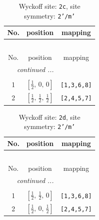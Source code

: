 \documentclass[fleqn,8pt]{jsarticle}
\begin{document}
\begin{longtable}{ccc}
\caption{Wyckoff site: {\tt 2c}, site symmetry: {\tt 2'/m'}}
 \\
 \hline \hline
No. & position & mapping \\ \hline \endfirsthead

\multicolumn{2}{l}{\tablename\ \thetable{}} \\
 \hline \hline
No. & position & mapping \\ \hline \endhead

 \hline \hline
\multicolumn{2}{r}{\footnotesize\it continued ...} \\ \endfoot

 \hline \hline
\multicolumn{2}{r}{} \\ \endlastfoot

1 & $\left[ \frac{1}{2},\, 0,\, 0 \right]$ & {\tt [1,3,6,8]} \\ \hline
2 & $\left[ \frac{1}{2},\, \frac{1}{2},\, \frac{1}{2} \right]$ & {\tt [2,4,5,7]} \\
\end{longtable}
\renewcommand{\arraystretch}{1.2}
\begin{longtable}{ccc}
\caption{Wyckoff site: {\tt 2d}, site symmetry: {\tt 2'/m'}}
 \\
 \hline \hline
No. & position & mapping \\ \hline \endfirsthead

\multicolumn{2}{l}{\tablename\ \thetable{}} \\
 \hline \hline
No. & position & mapping \\ \hline \endhead

 \hline \hline
\multicolumn{2}{r}{\footnotesize\it continued ...} \\ \endfoot

 \hline \hline
\multicolumn{2}{r}{} \\ \endlastfoot

1 & $\left[ \frac{1}{2},\, \frac{1}{2},\, 0 \right]$ & {\tt [1,3,6,8]} \\ \hline
2 & $\left[ \frac{1}{2},\, 0,\, \frac{1}{2} \right]$ & {\tt [2,4,5,7]} \\
\end{longtable}
\renewcommand{\arraystretch}{1.2}
\end{document}
